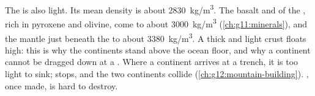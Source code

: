 The  is also light. Its mean density is about
\qty{2830}{kg/m^3}. The basalt and  of the , rich in
pyroxene and olivine, come to about \qty{3000}{kg/m^3}
(\cref{ch:g11:minerals}), and the mantle just beneath the  to about
\qty{3380}{kg/m^3}. A thick and light crust floats high: this is why the
continents stand above the ocean floor, and why a continent cannot be dragged
down at a . Where a continent arrives at a trench, it is too
light to sink;  stops, and the two continents collide
(\cref{ch:g12:mountain-building}). , once made, is hard to
destroy.

